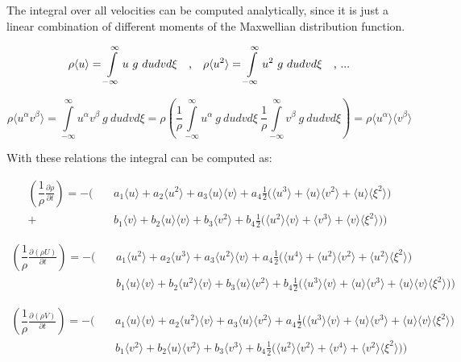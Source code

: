 \documentclass[
	pdftex,             %
	12pt,				%
	a4paper,		   	%
	english,				%
	oneside,			%
]{article}
\newcommand{\mom}[1]{\langle #1 \rangle}
\begin{document}
The integral over all velocities can be computed analytically, since it is just a linear combination of different moments of the Maxwellian distribution function.

\begin{equation}
\rho \mom{u} = \int \limits^{\infty}_{-\infty} u ~g~ du dv d\xi
~~~\textnormal{,} ~~~
\rho \mom{u^2} = \int \limits^{\infty}_{-\infty} u^2 ~g~ du dv d\xi
~~~\textnormal{, ...}
\end{equation}

\begin{equation}
\rho \mom{u^\alpha v^\beta}
= 
\int \limits^{\infty}_{-\infty} u^\alpha v^\beta ~g~ du dv d\xi
=
\rho \left(
\dfrac{1}{\rho}\int \limits^{\infty}_{-\infty} u^\alpha ~g~ du dv d\xi ~ 
\dfrac{1}{\rho}\int \limits^{\infty}_{-\infty} v^\beta  ~g~ du dv d\xi
\right)
=
\rho \mom{u^\alpha}\mom{v^\beta}
\end{equation}

With these relations the integral can be computed as:

\begin{eqnarray*}
\left( \dfrac{1}{\rho} \frac{\partial \rho}{\partial t} \right)
=
-%
\Bigg(
 &~&a_1 \mom{u} + a_2 \mom{u^2} + a_3 \mom{u}\mom{v}
+   a_4 \frac{1}{2} \Big( \mom{u^3} + \mom{u}\mom{v^2} + \mom{u}\mom{\xi^2} \Big)
\\
+&~&b_1 \mom{v} + b_2 \mom{u}\mom{v} + b_3 \mom{v^2}
+   b_4  \frac{1}{2} \Big( \mom{u^2}\mom{v} + \mom{v^3} + \mom{v}\mom{\xi^2} \Big)
\Bigg)
\end{eqnarray*}

\begin{eqnarray*}
\left( \dfrac{1}{\rho} \frac{\partial (\rho U)}{\partial t} \right)
=
-%
\Bigg(
&~&a_1 \mom{u^2} + a_2 \mom{u^3} + a_3 \mom{u^2}\mom{v}
+  a_4 \frac{1}{2} \Big( \mom{u^4} + \mom{u^2}\mom{v^2} + \mom{u^2}\mom{\xi^2} \Big)
\\
&~&b_1 \mom{u}\mom{v} + b_2 \mom{u^2}\mom{v} + b_3 \mom{u}\mom{v^2}
+  b_4 \frac{1}{2} \Big( \mom{u^3}\mom{v} + \mom{u}\mom{v^3} + \mom{u}\mom{v}\mom{\xi^2} \Big)
\Bigg)
\end{eqnarray*}

\begin{eqnarray*}
\left( \dfrac{1}{\rho} \frac{\partial (\rho V)}{\partial t} \right)
=
-%
\Bigg(
&~&a_1 \mom{u}\mom{v} + a_2 \mom{u^2}\mom{v} + a_3 \mom{u}\mom{v^2}
+  a_4 \frac{1}{2} \Big( \mom{u^3}\mom{v} + \mom{u}\mom{v^3} + \mom{u}\mom{v}\mom{\xi^2} \Big)
\\
&~&b_1 \mom{v^2} + b_2 \mom{u}\mom{v^2} + b_3 \mom{v^3}
+  b_4 \frac{1}{2} \Big( \mom{u^2}\mom{v^2} + \mom{v^4} + \mom{v^2}\mom{\xi^2} \Big)
\Bigg)
\end{eqnarray*}
\end{document}

